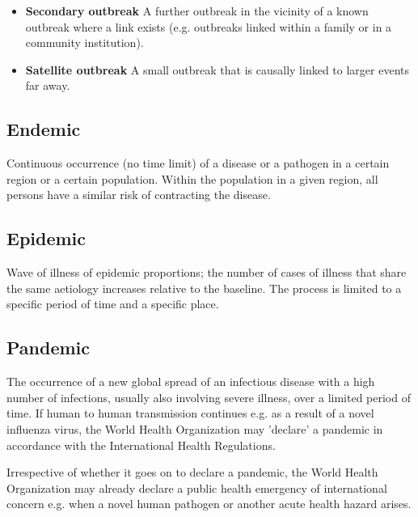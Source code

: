 \documentclass{article}
\begin{document}
\begin{itemize}
\item \textbf{Secondary outbreak }A further outbreak in the vicinity of a known\textbf{ }outbreak where a link exists (e.g. outbreaks linked within a family or in a community institution).


\item \textbf{Satellite outbreak }A small outbreak that is causally linked to larger events far away.


\end{itemize}

\subsection{Endemic}\label{H7673735}



Continuous occurrence (no time limit) of a disease or a pathogen in a certain region or a certain population. Within the population in a given region, all persons have a similar risk of contracting the disease.


\subsection{Epidemic}\label{H4123822}



Wave of illness of epidemic proportions; the number of cases of illness that share the same aetiology increases relative to the baseline. The process is limited to a specific period of time and a specific place.


\subsection{Pandemic}\label{H4394080}



The occurrence of a new global spread of an infectious disease with a high number of infections, usually also involving severe illness, over a limited period of time. If human to human transmission continues e.g. as a result of a novel influenza virus, the World Health Organization may 'declare' a pandemic in accordance with the International Health Regulations.


Irrespective of whether it goes on to declare a pandemic, the World Health Organization may already declare a public health emergency of international concern e.g. when a novel human pathogen or another acute health hazard arises.
\end{document}
